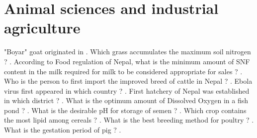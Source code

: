 \documentclass[10pt,a4paper,answers]{exam}
\begin{document}
\section*{Animal sciences and industrial agriculture}

\begin{questions}
  \question "Boyar" goat originated in .
  \question Which grass accumulates the maximum soil nitrogen ? \fillin[Desmodium][3cm].
  \question According to Food regulation of Nepal, what is the minimum amount of SNF content in the milk required for milk to be considered appropriate for sales ? \fillin[7.5\%][3cm].
  \question Who is the person to first import the improved breed of cattle in Nepal ? .
  \question Ebola virus first appeared in which country ? \fillin[Congo][3cm].
  \question First hatchery of Nepal was established in which district ? .
  \question What is the optimum amount of Dissolved Oxygen in a fish pond ? .
  \question What is the desirable pH for storage of semen ? \fillin[6.4-6.8][3cm].
  \question Which crop contains the most lipid among cereals ? \fillin[Oat][3cm].
  \question What is the best breeding method for poultry ? .
  \question What is the gestation period of pig ? \fillin[114 days][3cm].
\end{questions}
\end{document}
